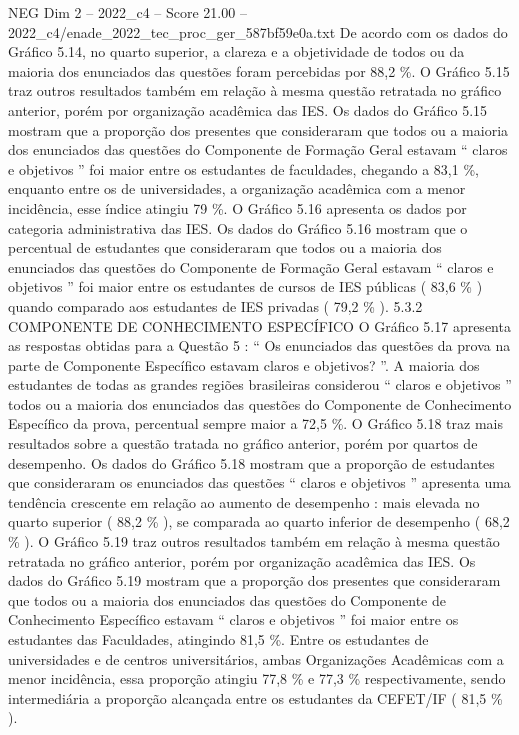 \begin{textsample}{NEG Dim 2 – 2022\_c4 – Score 21.00 – 2022\_c4/enade\_2022\_tec\_proc\_ger\_587bf59e0a.txt}
De acordo com os dados do Gráfico 5.14, no quarto superior, a clareza e a objetividade de todos ou da maioria dos enunciados das questões foram percebidas por 88,2 \%.
O Gráfico 5.15 traz outros resultados também em relação à mesma questão retratada no gráfico anterior, porém por organização acadêmica das IES.
Os dados do Gráfico 5.15 mostram que a proporção dos presentes que consideraram que todos ou a maioria dos enunciados das questões do Componente de Formação Geral estavam “ claros e objetivos ” foi maior entre os estudantes de faculdades, chegando a 83,1 \%, enquanto entre os de universidades, a organização acadêmica com a menor incidência, esse índice atingiu 79 \%.
O Gráfico 5.16 apresenta os dados por categoria administrativa das IES.
Os dados do Gráfico 5.16 mostram que o percentual de estudantes que consideraram que todos ou a maioria dos enunciados das questões do Componente de Formação Geral estavam “ claros e objetivos ” foi maior entre os estudantes de cursos de IES públicas ( 83,6 \% ) quando comparado aos estudantes de IES privadas ( 79,2 \% ). 5.3.2 COMPONENTE DE CONHECIMENTO ESPECÍFICO O Gráfico 5.17 apresenta as respostas obtidas para a Questão 5 : “ Os enunciados das questões da prova na parte de Componente Específico estavam claros e objetivos? ”.
A maioria dos estudantes de todas as grandes regiões brasileiras considerou “ claros e objetivos ” todos ou a maioria dos enunciados das questões do Componente de Conhecimento Específico da prova, percentual sempre maior a 72,5 \%.
O Gráfico 5.18 traz mais resultados sobre a questão tratada no gráfico anterior, porém por quartos de desempenho.
Os dados do Gráfico 5.18 mostram que a proporção de estudantes que consideraram os enunciados das questões “ claros e objetivos ” apresenta uma tendência crescente em relação ao aumento de desempenho : mais elevada no quarto superior ( 88,2 \% ), se comparada ao quarto inferior de desempenho ( 68,2 \% ).
O Gráfico 5.19 traz outros resultados também em relação à mesma questão retratada no gráfico anterior, porém por organização acadêmica das IES.
Os dados do Gráfico 5.19 mostram que a proporção dos presentes que consideraram que todos ou a maioria dos enunciados das questões do Componente de Conhecimento Específico estavam “ claros e objetivos ” foi maior entre os estudantes das Faculdades, atingindo 81,5 \%.
Entre os estudantes de universidades e de centros universitários, ambas Organizações Acadêmicas com a menor incidência, essa proporção atingiu 77,8 \% e 77,3 \% respectivamente, sendo intermediária a proporção alcançada entre os estudantes da CEFET/IF ( 81,5 \% ).

\end{textsample}
